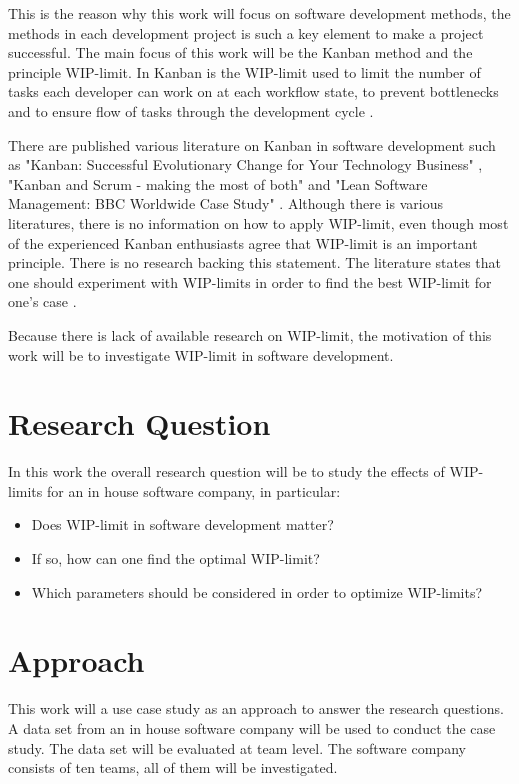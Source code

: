 \documentclass[UKenglish]{ifimaster}  %
\begin{document}
This is the reason why this work will focus on software development methods, the methods in each development project is such a key element to make a project successful. The main focus of this work will be the Kanban method and the principle WIP-limit. In Kanban is the WIP-limit used to  limit the number of tasks each developer can work on at each workflow state, to prevent bottlenecks and to ensure flow of tasks through the development cycle \parencite{gandomani2013important} \parencite{ikonen2010exploring}.

There are published various literature on Kanban in software development such as "Kanban: Successful Evolutionary Change for Your Technology Business" \parencite{0984521402}, "Kanban and Scrum - making the most of both"  \parencite{Kniberg} and "Lean Software Management: BBC Worldwide Case Study" \parencite{Joyce}. Although there is various literatures, there is no information on how to apply WIP-limit, even though most of the experienced Kanban enthusiasts agree that WIP-limit is an important principle.  There is no research backing this statement.  The literature states that one should experiment with WIP-limits in order to find the best WIP-limit for one's case \parencite{Ikonen} \parencite{Kniberg}.

Because there is lack of available research on WIP-limit, the motivation of this work will be to investigate WIP-limit in software development.

\section{Research Question}
\label{chap:RQ}
In this work the overall research question will be to study the effects of WIP-limits for an in house software company, in particular:
\begin{itemize}
\item Does WIP-limit in software development matter?
\item If so, how can one find the optimal WIP-limit?
\item Which parameters should be considered in order to optimize WIP-limits? 
\end{itemize}


\section{Approach}
This work will a use case study as an approach  to answer the research questions.  A data set from an in house software company will be used to conduct the case study.  The data set will be evaluated at team level. The software company consists of ten teams, all of them will be investigated.
\end{document}
